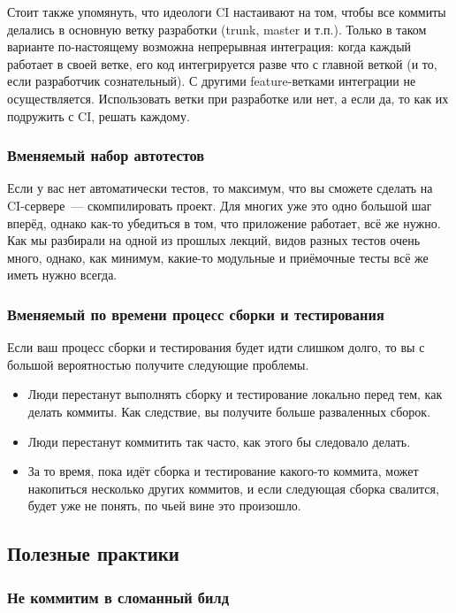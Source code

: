\documentclass{../../text-style}
\begin{document}
Стоит также упомянуть, что идеологи CI настаивают на том, чтобы все коммиты делались в основную ветку разработки (trunk, master и т.п.). Только в таком варианте по-настоящему возможна непрерывная интеграция: когда каждый работает в своей ветке, его код интегрируется разве что с главной веткой (и то, если разработчик сознательный). С другими feature-ветками интеграции не осуществляется. Использовать ветки при разработке или нет, а если да, то как их подружить с CI, решать каждому.

\subsubsection{Вменяемый набор автотестов}

Если у вас нет автоматически тестов, то максимум, что вы сможете сделать на CI-сервере~--- скомпилировать проект. Для многих уже это одно большой шаг вперёд, однако как-то убедиться в том, что приложение работает, всё же нужно. Как мы разбирали на одной из прошлых лекций, видов разных тестов очень много, однако, как минимум, какие-то модульные и приёмочные тесты всё же иметь нужно всегда.

\subsubsection{Вменяемый по времени процесс сборки и тестирования}

Если ваш процесс сборки и тестирования будет идти слишком долго, то вы с большой вероятностью получите следующие проблемы.

\begin{itemize}
    \item Люди перестанут выполнять сборку и тестирование локально перед тем, как делать коммиты. Как следствие, вы получите больше разваленных сборок.
    \item Люди перестанут коммитить так часто, как этого бы следовало делать.
    \item За то время, пока идёт сборка и тестирование какого-то коммита, может накопиться несколько других коммитов, и если следующая сборка свалится, будет уже не понять, по чьей вине это произошло.
\end{itemize}

\subsection{Полезные практики}

\subsubsection{Не коммитим в сломанный билд}
\end{document}
